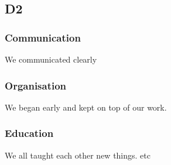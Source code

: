 \subsection{D2}
    \subsubsection{Communication} We communicated clearly
    \subsubsection{Organisation} We began early and kept on top of our work.
    \subsubsection{Education} We all taught each other new things. etc
